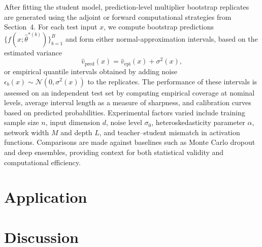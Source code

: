 \documentclass[12pt, titlepage, reqno]{article}
\begin{document}
After fitting the student model, prediction-level multiplier bootstrap
replicates are generated using the adjoint or forward computational
strategies from Section~4. For each test input $x$, we compute
bootstrap predictions $\{f(x;\hat\theta^{*(b)})\}_{b=1}^B$ and form
either normal-approximation intervals, based on the estimated variance
\[
  \widehat v_{\mathrm{pred}}(x) =
  \widehat v_{\mathrm{epi}}(x) + \sigma^2(x),
\]
or empirical quantile intervals obtained by adding noise
$\epsilon_b(x)\sim\mathcal{N}(0,\sigma^2(x))$ to the replicates. The
performance of these intervals is assessed on an independent test set
by computing empirical coverage at nominal levels, average interval
length as a measure of sharpness, and calibration curves based on
predicted probabilities. Experimental factors varied include training
sample size $n$, input dimension $d$, noise level $\sigma_0$,
heteroskedasticity parameter $\alpha$, network width $M$ and depth $L$,
and teacher–student mismatch in activation functions. Comparisons are
made against baselines such as Monte Carlo dropout and deep ensembles,
providing context for both statistical validity and computational
efficiency.


\section{Application}

\section{Discussion}





	
\end{document}
